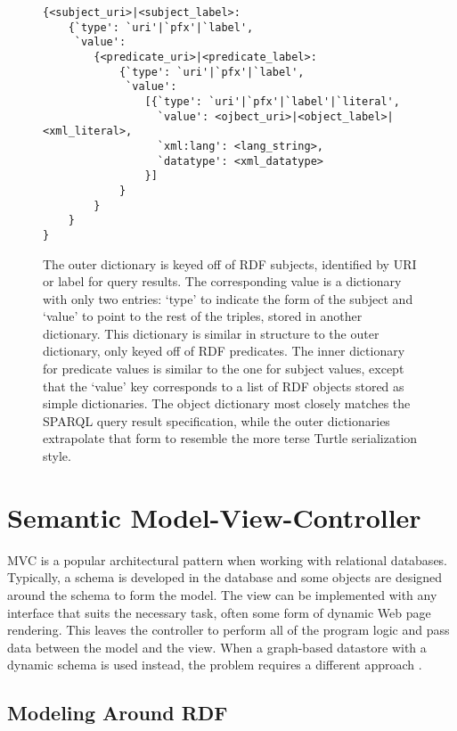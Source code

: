 \begin{figure}[p]
\singlespace
\begin{verbatim}
{<subject_uri>|<subject_label>:
    {`type': `uri'|`pfx'|`label',
     `value':
        {<predicate_uri>|<predicate_label>:
            {`type': `uri'|`pfx'|`label',
             `value':
                [{`type': `uri'|`pfx'|`label'|`literal',
                  `value': <ojbect_uri>|<object_label>|<xml_literal>,
                  `xml:lang': <lang_string>,
                  `datatype': <xml_datatype>
                }]
            }
        }
    }
}
\end{verbatim}
\caption[Structure of a triple in SKMF]
 {\narrower The outer dictionary is keyed off of RDF subjects, identified by URI or label for query results. The corresponding value is a dictionary with only two entries: `type' to indicate the form of the subject and `value' to point to the rest of the triples, stored in another dictionary. This dictionary is similar in structure to the outer dictionary, only keyed off of RDF predicates. The inner dictionary for predicate values is similar to the one for subject values, except that the `value' key corresponds to a list of RDF objects stored as simple dictionaries. The object dictionary most closely matches the SPARQL query result specification, while the outer dictionaries extrapolate that form to resemble the more terse Turtle serialization style.
 }
\label{skmf-triple}
\end{figure}



\section{Semantic Model-View-Controller}

MVC is a popular architectural pattern when working with relational databases. Typically, a schema is developed in the database and some objects are designed around the schema to form the model. The view can be implemented with any interface that suits the necessary task, often some form of dynamic Web page rendering. This leaves the controller to perform all of the program logic and pass data between the model and the view. When a graph-based datastore with a dynamic schema is used instead, the problem requires a different approach \cite{semanticwebprogram}.


\subsection{Modeling Around RDF}

